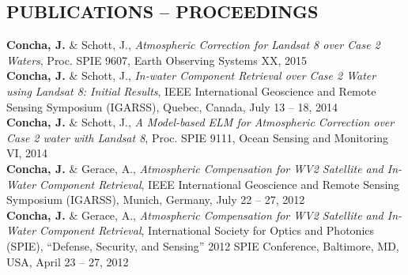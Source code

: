 \documentclass[11pt]{res} %
\begin{document}
\begin{resume}
\vspace{-0.2in}
\section{PUBLICATIONS -- PROCEEDINGS}
\vspace{0.1in}
{\bf Concha, J.} $\&$ Schott, J., {\it Atmospheric Correction for Landsat 8 over Case 2 Waters}, Proc. SPIE 9607, Earth Observing Systems XX, 2015
\vspace{0.1in}\\
{\bf Concha, J.} $\&$ Schott, J., {\it In-water Component Retrieval over Case 2 Water using Landsat 8: Initial Results}, IEEE International Geoscience and Remote Sensing Symposium (IGARSS), Quebec, Canada, July 13 -- 18, 2014
\vspace{0.1in}\\
{\bf Concha, J.} $\&$ Schott, J., {\it A Model-based ELM for Atmospheric Correction over Case 2 water with Landsat 8}, Proc. SPIE 9111, Ocean Sensing and Monitoring VI, 2014
\vspace{0.1in}\\
{\bf Concha, J.} $\&$ Gerace, A., {\it Atmospheric Compensation for WV2 Satellite and In-Water Component Retrieval}, IEEE International Geoscience and Remote Sensing Symposium (IGARSS), Munich, Germany, July 22 -- 27, 2012
\vspace{0.1in}\\
{\bf Concha, J.} $\&$ Gerace, A., {\it Atmospheric Compensation for WV2 Satellite and In-Water Component Retrieval}, International Society for Optics and Photonics (SPIE), ``Defense, Security, and Sensing'' 2012 SPIE Conference, Baltimore, MD, USA, April 23 -- 27, 2012\\
\vspace{-0.1in}

\end{resume}
\end{document}

